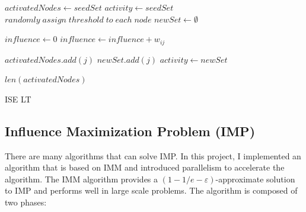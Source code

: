 \documentclass[conference]{IEEEtran}
\begin{document}
    \begin{algorithm}[H]
        \begin{algorithmic}[1]
        \State $activatedNodes \gets seedSet$
        \State $activity \gets seedSet$
        \State $randomly\; assign\; threshold\; to\; each\; node$
            \State $newSet \gets \emptyset$
                    
                        \State $influence \gets 0$
                            \State $influence \gets influence + w_{ij}$
                            \EndIf
                        \EndFor

                            \State $activatedNodes.add(j)$
                            \State $newSet.add(j)$
                        \EndIf
                    \EndIf
                \EndFor
            \EndFor
            \State $activity \gets newSet$
        \EndWhile


        \Return $len(activatedNodes)$
        \EndFunction
        \end{algorithmic}
        \caption{ISE LT}
    \end{algorithm}

    \subsection{Influence Maximization Problem (IMP)}
    There are many algorithms that can solve IMP. In this project, I implemented an algorithm that is based on IMM \cite{Tang:2015:IMN:2723372.2723734} and introduced parallelism to accelerate the algorithm. The IMM algorithm provides a $(1-1/e-\varepsilon)$-approximate solution to IMP and performs well in large scale problems.
    The algorithm is composed of two phases:
\end{document}
